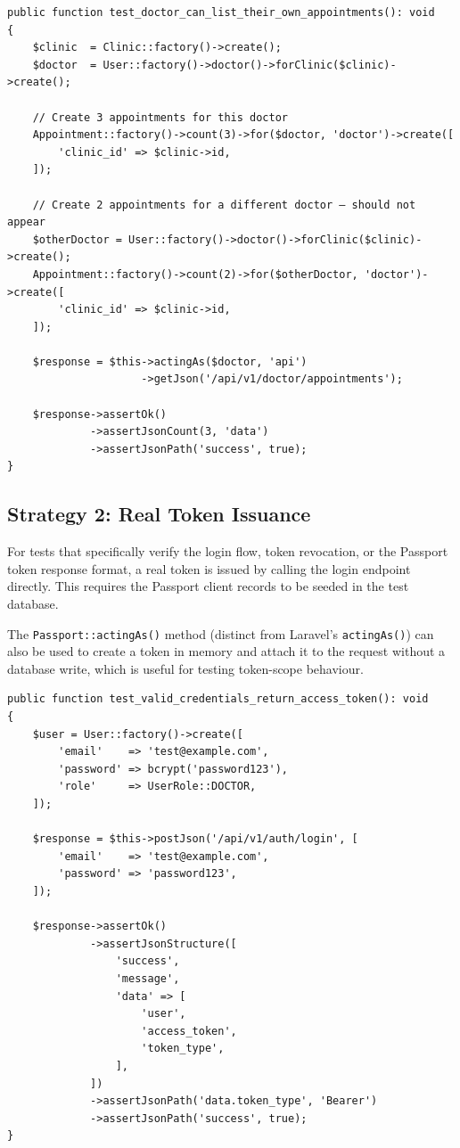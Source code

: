 \begin{lstlisting}[style=php, caption={Using \texttt{actingAs()} to
  authenticate as a specific user in a feature test.}]
public function test_doctor_can_list_their_own_appointments(): void
{
    $clinic  = Clinic::factory()->create();
    $doctor  = User::factory()->doctor()->forClinic($clinic)->create();

    // Create 3 appointments for this doctor
    Appointment::factory()->count(3)->for($doctor, 'doctor')->create([
        'clinic_id' => $clinic->id,
    ]);

    // Create 2 appointments for a different doctor — should not appear
    $otherDoctor = User::factory()->doctor()->forClinic($clinic)->create();
    Appointment::factory()->count(2)->for($otherDoctor, 'doctor')->create([
        'clinic_id' => $clinic->id,
    ]);

    $response = $this->actingAs($doctor, 'api')
                     ->getJson('/api/v1/doctor/appointments');

    $response->assertOk()
             ->assertJsonCount(3, 'data')
             ->assertJsonPath('success', true);
}
\end{lstlisting}

\subsection{Strategy 2: Real Token Issuance}

For tests that specifically verify the login flow, token revocation, or
the Passport token response format, a real token is issued by calling
the login endpoint directly. This requires the Passport client records
to be seeded in the test database.

The \texttt{Passport::actingAs()} method (distinct from Laravel's
\texttt{actingAs()}) can also be used to create a token in memory and
attach it to the request without a database write, which is useful for
testing token-scope behaviour.

\begin{lstlisting}[style=php, caption={Testing the login endpoint with a
  real credential round-trip.}]
public function test_valid_credentials_return_access_token(): void
{
    $user = User::factory()->create([
        'email'    => 'test@example.com',
        'password' => bcrypt('password123'),
        'role'     => UserRole::DOCTOR,
    ]);

    $response = $this->postJson('/api/v1/auth/login', [
        'email'    => 'test@example.com',
        'password' => 'password123',
    ]);

    $response->assertOk()
             ->assertJsonStructure([
                 'success',
                 'message',
                 'data' => [
                     'user',
                     'access_token',
                     'token_type',
                 ],
             ])
             ->assertJsonPath('data.token_type', 'Bearer')
             ->assertJsonPath('success', true);
}
\end{lstlisting}

